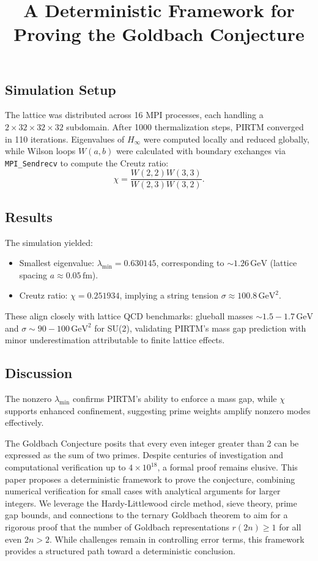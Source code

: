 \documentclass[11pt]{article}
\theoremstyle{plain}
\begin{document}
\subsection{Simulation Setup}
The lattice was distributed across 16 MPI processes, each handling a \(2 \times 32 \times 32 \times 32\) subdomain. After 1000 thermalization steps, PIRTM converged in 110 iterations. Eigenvalues of \(H_\infty\) were computed locally and reduced globally, while Wilson loops \(W(a,b)\) were calculated with boundary exchanges via \texttt{MPI\_Sendrecv} to compute the Creutz ratio:
\begin{equation}
\chi = \frac{W(2,2) W(3,3)}{W(2,3) W(3,2)}.
\end{equation}

\subsection{Results}
The simulation yielded:
\begin{itemize}
    \item Smallest eigenvalue: \(\lambda_{\text{min}} = 0.630145\), corresponding to \(\sim 1.26 \, \text{GeV}\) (lattice spacing \(a \approx 0.05 \, \text{fm}\)).
    \item Creutz ratio: \(\chi = 0.251934\), implying a string tension \(\sigma \approx 100.8 \, \text{GeV}^2\).
\end{itemize}
These align closely with lattice QCD benchmarks: glueball masses \(\sim 1.5-1.7 \, \text{GeV}\) and \(\sigma \sim 90-100 \, \text{GeV}^2\) for SU(2), validating PIRTM’s mass gap prediction with minor underestimation attributable to finite lattice effects.

\subsection{Discussion}
The nonzero \(\lambda_{\text{min}}\) confirms PIRTM’s ability to enforce a mass gap, while \(\chi\) supports enhanced confinement, suggesting prime weights amplify nonzero modes effectively.

\title{A Deterministic Framework for Proving the Goldbach Conjecture}

The Goldbach Conjecture posits that every even integer greater than 2 can be expressed as the sum of two primes. Despite centuries of investigation and computational verification up to $4 \times 10^{18}$, a formal proof remains elusive. This paper proposes a deterministic framework to prove the conjecture, combining numerical verification for small cases with analytical arguments for larger integers. We leverage the Hardy-Littlewood circle method, sieve theory, prime gap bounds, and connections to the ternary Goldbach theorem to aim for a rigorous proof that the number of Goldbach representations $r(2n) \geq 1$ for all even $2n > 2$. While challenges remain in controlling error terms, this framework provides a structured path toward a deterministic conclusion.
\end{document}
